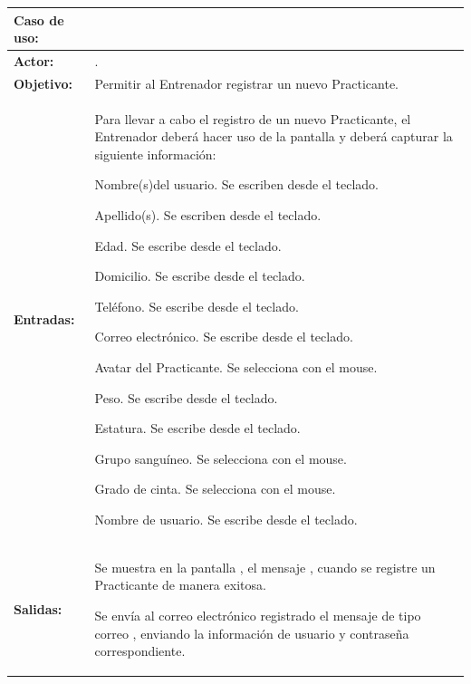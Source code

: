 \begin{table}[H]
\centering
\begin{tabular}{| l | p{12 cm} |}
\hline
\rowcolor[rgb]{0.529412, 0.807843, 0.980392} {\textbf{Caso de uso:}} & \hspace{7em}{\textbf{CUE01 Registrar Practicante}}\\
\hline
\textbf{Actor:} &  \nameref{act:Entrenador}. \\
\hline
\textbf{Objetivo:} & Permitir al Entrenador registrar un nuevo Practicante.\\
\hline
\textbf{Entradas:} & Para llevar a cabo el registro de un nuevo Practicante, el Entrenador deberá hacer uso de la pantalla \nameref{pant:IUE01} y deberá capturar la siguiente información:
		\begin{compactitem} 
			\setlength\itemsep{-0.25em}
			\item Nombre(s)del usuario. Se escriben desde el teclado.
			\item Apellido(s). Se escriben desde el teclado.
			\item Edad. Se escribe desde el teclado.
			\item Domicilio. Se escribe desde el teclado.
			\item Teléfono. Se escribe desde el teclado.
			\item Correo electrónico. Se escribe desde el teclado.
			\item Avatar del Practicante. Se selecciona con el mouse.
			\item Peso. Se escribe desde el teclado.
			\item Estatura. Se escribe desde el teclado.
			\item Grupo sanguíneo. Se selecciona con el mouse.
			\item Grado de cinta. Se selecciona con el mouse.
			\item Nombre de usuario. Se escribe desde el teclado.
		\end{compactitem} \\
\hline
\textbf{Salidas:} & \vspace{-2mm}	%
					\begin{compactitem}
						\setlength\itemsep{-0.25em}
						\item Se muestra en la pantalla \nameref{pant:IUE01}, el mensaje \nameref{msj:MSG01}, cuando se registre un Practicante de manera exitosa.
						\item Se envía al correo electrónico registrado el mensaje de tipo correo \nameref{msj:MSG08}, enviando la información de usuario y contraseña correspondiente.

\end{compactitem}
\end{tabular}
\end{table}
